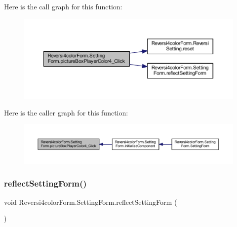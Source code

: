 Here is the call graph for this function\+:\nopagebreak
\begin{figure}[H]
\begin{center}
\leavevmode
\includegraphics[width=350pt]{class_reversi4color_form_1_1_setting_form_ab63992b26a7b6709437689625b8a1143_cgraph}
\end{center}
\end{figure}
Here is the caller graph for this function\+:\nopagebreak
\begin{figure}[H]
\begin{center}
\leavevmode
\includegraphics[width=350pt]{class_reversi4color_form_1_1_setting_form_ab63992b26a7b6709437689625b8a1143_icgraph}
\end{center}
\end{figure}
\mbox{\label{class_reversi4color_form_1_1_setting_form_a33a42eed1cef78b8906da8ff65874ecd}} 
\subsubsection{\texorpdfstring{reflect\+Setting\+Form()}{reflectSettingForm()}}
{\footnotesize\ttfamily void Reversi4color\+Form.\+Setting\+Form.\+reflect\+Setting\+Form (\begin{DoxyParamCaption}{ }\end{DoxyParamCaption})\hspace{0.3cm}{\ttfamily [private]}}



